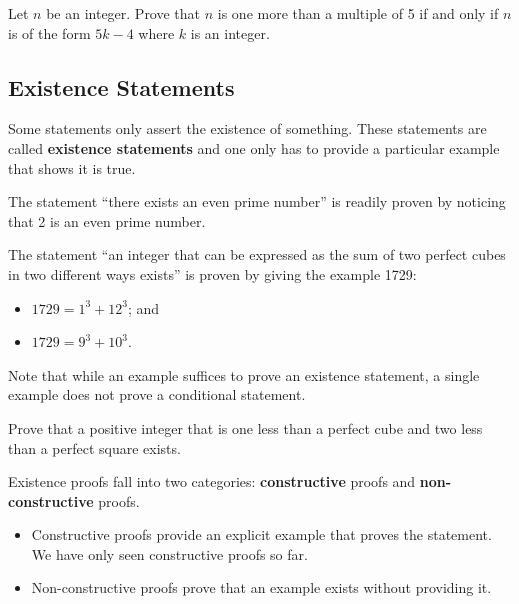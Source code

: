 \begin{exercise}
    Let $n$ be an integer. Prove that $n$ is one more than a multiple of 5 if and only if $n$ is of the form $5k - 4$ where $k$ is an integer.
\end{exercise}

\subsection{Existence Statements}
Some statements only assert the existence of something. These statements are called \textbf{existence statements} and one only has to provide a particular example that shows it is true. 
\begin{example}
    The statement ``there exists an even prime number'' is readily proven by noticing that 2 is an even prime number.
\end{example}
\begin{example}
    The statement ``an integer that can be expressed as the sum of two perfect cubes in two different ways exists'' is proven by giving the example 1729:
    \begin{itemize}
        \item $1729 = 1^3 + 12^3$; and
        \item $1729 = 9^3 + 10^3$.
    \end{itemize}
\end{example}
Note that while an example suffices to prove an existence statement, a single example does not prove a conditional statement.
\begin{exercise}
    Prove that a positive integer that is one less than a perfect cube and two less than a perfect square exists.
\end{exercise}

\newpage

Existence proofs fall into two categories: \textbf{constructive} proofs and \textbf{non-constructive} proofs.
\begin{itemize}
    \item Constructive proofs provide an explicit example that proves the statement. We have only seen constructive proofs so far.
    \item Non-constructive proofs prove that an example exists without providing it.
\end{itemize}

